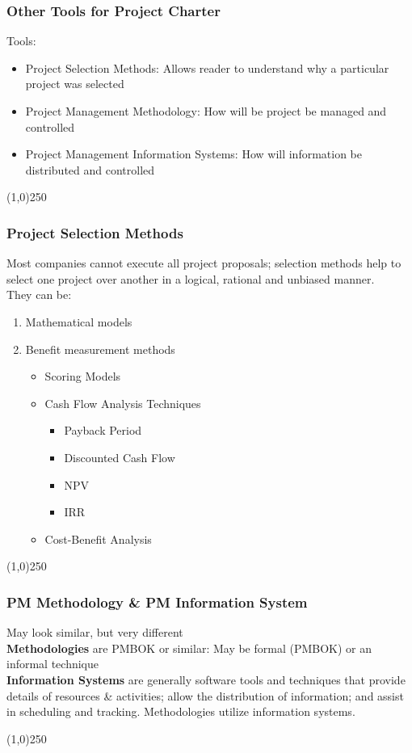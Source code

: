 %
%

\begin{frame}
\frametitle{Other Tools for Project Charter} 
Tools:
\begin{itemize}
	\item Project Selection Methods: Allows reader to understand why a particular project was selected
	\item Project Management Methodology: How will be project be managed and controlled
	\item Project Management Information Systems: How will information be distributed and controlled
\end{itemize}
\end{frame}\begin{center}\line(1,0){250}\end{center}
%
%

\begin{frame}
\frametitle{Project Selection Methods}
Most companies cannot execute all project proposals; selection methods help to select one project over another in a logical, rational and unbiased manner.\\
They can be:
\begin{enumerate}
	\item Mathematical models    
	\item Benefit measurement methods
\begin{itemize}
	\item Scoring Models
	\item Cash Flow Analysis Techniques    
		\begin{itemize}
			\item Payback Period
			\item Discounted Cash Flow
			\item NPV
			\item IRR
		\end{itemize}
	\item Cost-Benefit Analysis    
\end{itemize}
\end{enumerate}
	
\end{frame}\begin{center}\line(1,0){250}\end{center}
%

%

\begin{frame}
\frametitle{PM Methodology \& PM Information System}
May look similar, but very different\\
\textbf{Methodologies} are PMBOK or similar: May be formal (PMBOK) or an informal technique\\
\textbf{Information Systems} are generally software tools and techniques that provide details of resources \& activities; allow the distribution of information; and assist in scheduling and tracking.  Methodologies utilize information systems.
\end{frame}\begin{center}\line(1,0){250}\end{center}
%
%


